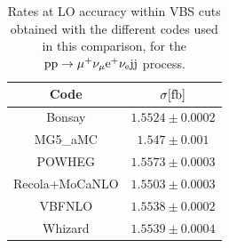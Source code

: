 \begin{table}[h!]
    \centering
    \begin{tabular}{c|c}
        Code  &  $\sigma[\rm{fb}]$  \\
        \hline
        \hline
        {\sc Bonsay}  &  $1.5524 \pm 0.0002$ \\
        {\sc MG5\_aMC}&  $1.547 \pm 0.001$  \\ 
        {\sc POWHEG}  &  $1.5573 \pm 0.0003$ \\
        {\sc Recola+MoCaNLO}  &  $1.5503 \pm 0.0003$ \\
        {\sc VBFNLO}  &  $1.5538 \pm 0.0002$ \\
        {\sc Whizard}&  $ 1.5539 \pm 0.0004 $   
    \end{tabular}
    \caption{\label{tab:wg1_LOrates} Rates at LO accuracy within VBS cuts obtained with the different codes used in this comparison, 
    for the ${\rm p}{\rm p}\to\mu^+\nu_\mu{\rm e}^+\nu_{\rm e}{\rm j}{\rm j}$ process.}
\end{table}
%
